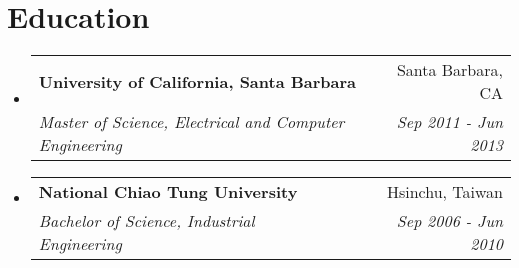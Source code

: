 \documentclass[letterpaper,12pt]{article}
\makeatletter
\newcommand{\resumeSubheading}[4]{
  \vspace{-1pt}\item
    \begin{tabular*}{0.97\textwidth}{l@{\extracolsep{\fill}}r}
      \textbf{#1} & #2 \\
      \textit{\small#3} & \textit{\small #4} \\
    \end{tabular*}
    \vspace{-7pt}
}
\newcommand{\resumeSubHeadingListStart}{\begin{itemize}[leftmargin=*]}
\newcommand{\resumeSubHeadingListEnd}{\end{itemize}}
\makeatother
\begin{document}
\section{Education}
  \resumeSubHeadingListStart
    \resumeSubheading
      {University of California, Santa Barbara}{Santa Barbara, CA}
      {Master of Science, Electrical and Computer Engineering}{Sep 2011 - Jun 2013}
    \resumeSubheading
      {National Chiao Tung University}{Hsinchu, Taiwan}
      {Bachelor of Science, Industrial Engineering}{Sep 2006 - Jun 2010}
  \resumeSubHeadingListEnd
\end{document}
